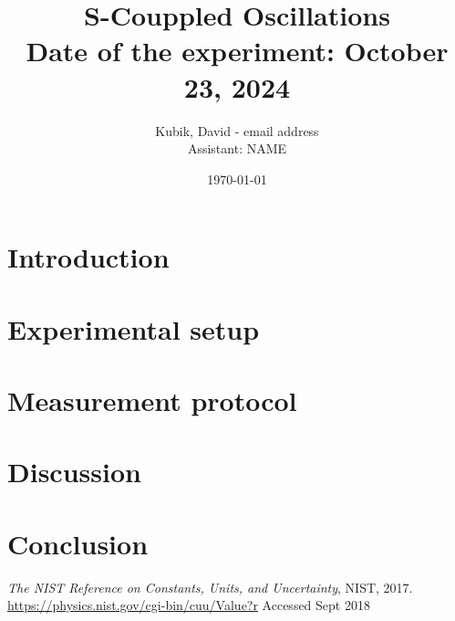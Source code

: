 \documentclass[11pt, a4paper]{article}
\title{\textbf{S-Couppled Oscillations} \\
	\normalsize{Date of the experiment: October 23, 2024}} %
\date{\today}  %
\author{\normalsize{Kubik, David - email address} \\ %
	    \normalsize{Assistant: NAME}} %
\begin{document}
\maketitle


\section{Introduction}




\section{Experimental setup} \label{sec:ex}



\section{Measurement protocol} %


\section{Discussion} %






\section{Conclusion}



\begin{thebibliography}{9}%




  \emph{The NIST Reference on Constants, Units, and Uncertainty},
  NIST,
  2017. \\
  \url{https://physics.nist.gov/cgi-bin/cuu/Value?r}
  Accessed Sept 2018
\end{thebibliography}
\end{document}
